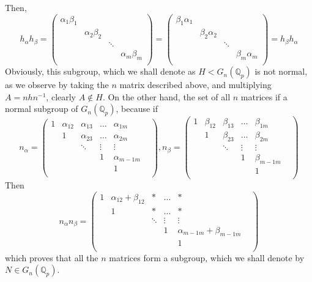 \documentclass[12pt]{article}
\begin{document}
Then, $$h_{\alpha}h_{\beta}=\begin{pmatrix}
\alpha_1\beta_1 & & &\\
& \alpha_2\beta_2 & &\\
& & \ddots &\\
& & & \alpha_m\beta_m\\
\end{pmatrix}=\begin{pmatrix}
\beta_1\alpha_1 & & &\\
& \beta_2\alpha_2 & &\\
& & \ddots &\\
& & & \beta_m\alpha_m\\
\end{pmatrix}=h_{\beta}h_{\alpha}
$$
Obviously, this subgroup, which we shall denote as $H<G_n(\mathbb{Q}_p)$ is not normal, as we observe by taking the $n$ matrix described above, and multiplying $A=nhn^{-1}$, clearly $A\notin H$. On the other hand, the set of all $n$ matrices if a normal subgroup of $G_n(\mathbb{Q}_p)$, because if $$n_{\alpha}=\begin{pmatrix}
1 & \alpha_{12} & \alpha_{13} & \dots & \alpha_{1m}\\
& 1 & \alpha_{23} & \dots & \alpha_{2m}\\
& & \ddots &  \vdots& \vdots &\\
& &  &  1& \alpha_{m-1m} &\\
& & & & 1\\
\end{pmatrix},n_{\beta}=\begin{pmatrix}
1 & \beta_{12} & \beta_{13} & \dots & \beta_{1m}\\
& 1 & \beta_{23} & \dots & \beta_{2m}\\
& & \ddots &  \vdots& \vdots &\\
& &  &  1& \beta_{m-1m} &\\
& & & & 1\\
\end{pmatrix}
$$
Then $$n_\alpha n_\beta=\begin{pmatrix}
1 & \alpha_{12}+\beta_{12} & * & \dots & *\\
& 1 & * & \dots & *\\
& & \ddots &  \vdots& \vdots &\\
& &  &  1& \alpha_{m-1m}+\beta_{m-1m} &\\
& & & & 1\\
\end{pmatrix}
$$
which proves that all the $n$ matrices form a subgroup, which we shall denote by $N\in G_n(\mathbb{Q}_p)$.
\end{document}
